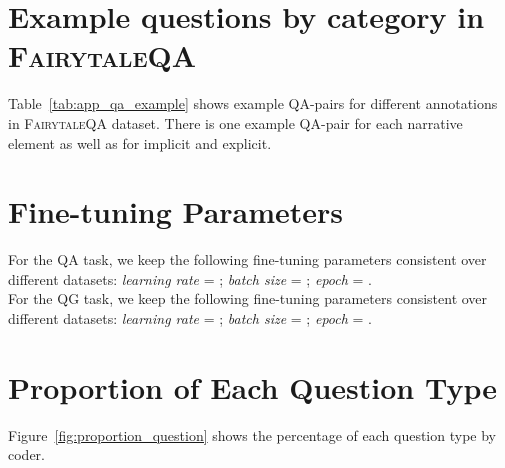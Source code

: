 \documentclass[11pt]{article}
\newcommand{\datasetname}{\textsc{FairytaleQA}\xspace}
\begin{document}
\section{Example questions by category in \datasetname}
\label{appendix:example_qs}

Table~\ref{tab:app_qa_example} shows example QA-pairs for different annotations in \datasetname dataset. There is one example QA-pair for each narrative element as well as for implicit and explicit. 




\section{Fine-tuning Parameters}
\label{appendix:parameters}
For the QA task, we keep the following fine-tuning parameters consistent over different datasets: \textit{learning rate} = ; \textit{batch size} = ; \textit{epoch} = . \\
For the QG task, we keep the following fine-tuning parameters consistent over different datasets: \textit{learning rate} = ; \textit{batch size} = ; \textit{epoch} = . 




\label{app:att_plot}


\section{Proportion of Each Question Type}

Figure~\ref{fig:proportion_question} shows the percentage of each question type by coder. 
\end{document}
